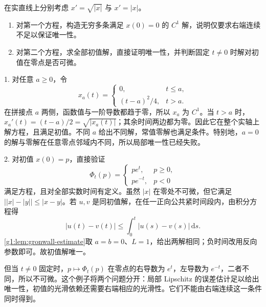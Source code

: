 \begin{exercise}\label{g1:ex:ode-regularity-counterexamples}
	在实直线上分别考虑 \(x'=\sqrt{|x|}\) 与 \(x'=|x|\)。
	\begin{enumerate}
		\item 对第一个方程，构造无穷多条满足 \(x(0)=0\) 的 \(C^1\) 解，说明仅要求右端连续不足以保证唯一性。
		\item 对第二个方程，求全部初值解，直接证明唯一性，并判断固定 \(t\ne0\) 时解对初值在零点是否可微。
	\end{enumerate}
\end{exercise}
\begin{solution}
	1. 对任意 \(a\geq0\)，令
	\[
		x_a(t)=\begin{cases}0,&t\leq a,\\(t-a)^2/4,&t>a.\end{cases}
	\]
	在拼接点 \(a\) 两侧，函数值与一阶导数都趋于零，所以 \(x_a\) 为 \(C^1\)。当 \(t>a\) 时，\(x_a'(t)=(t-a)/2=\sqrt{|x_a(t)|}\)；其余时间两边都为零。因此它在整个实轴上解方程，且满足初值。不同 \(a\) 给出不同解，常值零解也满足条件。特别地，\(a=0\) 的解与零解在任意零点邻域内不同，所以局部唯一性已经失败。

	2. 对初值 \(x(0)=p\)，直接验证
	\[
		\Phi_t(p)=\begin{cases}p e^t,&p\geq0,\\p e^{-t},&p<0\end{cases}
	\]
	满足方程，且对全部实数时间有定义。虽然 \(|x|\) 在零处不可微，但它满足 \(\bigl||x|-|y|\bigr|\leq|x-y|\)。若 \(u,v\) 是同初值解，在任一正向公共紧时间段内，由积分方程得
	\[
		|u(t)-v(t)|\leq\int_0^t|u(s)-v(s)|\,\mathrm{d}s.
	\]
	\cref{g1:lem:gronwall-estimate}取 \(a=b=0\)、\(L=1\)，给出两解相同；负时间改用反向参数即可。故初值解唯一。

	但当 \(t\ne0\) 固定时，\(p\mapsto\Phi_t(p)\) 在零点的右导数为 \(e^t\)，左导数为 \(e^{-t}\)，二者不同，所以不可微。这个例子将两个问题分开：局部 Lipschitz 的误差估计足以给出唯一性，初值的光滑依赖还需要右端相应的光滑性。它们不能由右端连续这一条件同时得到。
\end{solution}

